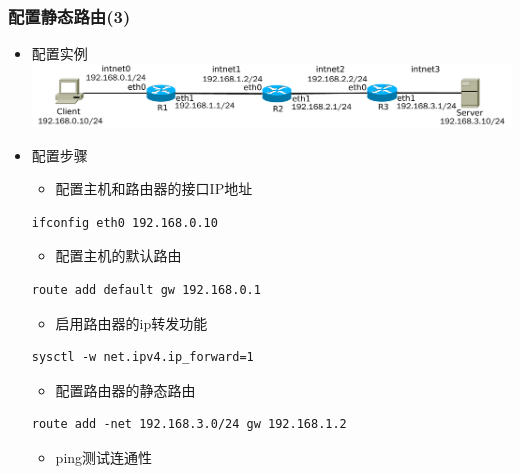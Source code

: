 \documentclass[xcolor=svgnames,presentation]{beamer}
\begin{document}
\begin{frame}[fragile]
\frametitle{配置静态路由(3)}
\label{sec-3-4}
\begin{itemize}

\item 配置实例\\
\label{sec-3-4-1}%
\includegraphics[width=.9\linewidth]{img/router2.pdf}

\item 配置步骤
\label{sec-3-4-2}%
\begin{itemize}
\item 配置主机和路由器的接口IP地址
\end{itemize}

\begin{verbatim}
ifconfig eth0 192.168.0.10
\end{verbatim}
\begin{itemize}
\item 配置主机的默认路由
\end{itemize}

\begin{verbatim}
route add default gw 192.168.0.1
\end{verbatim}
\begin{itemize}
\item 启用路由器的ip转发功能
\end{itemize}

\begin{verbatim}
sysctl -w net.ipv4.ip_forward=1
\end{verbatim}
\begin{itemize}
\item 配置路由器的静态路由
\end{itemize}

\begin{verbatim}
route add -net 192.168.3.0/24 gw 192.168.1.2
\end{verbatim}
\begin{itemize}
\item ping测试连通性
\end{itemize}
\end{itemize} %
\end{frame}
\end{document}
